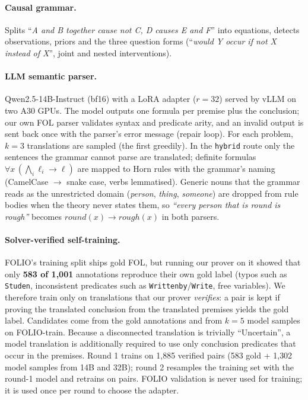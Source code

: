 \documentclass[10pt,a4paper]{article}
\begin{document}
\paragraph{Causal grammar.} Splits ``\emph{A and B together cause not C, D causes E and F}'' into equations, detects observations, priors and the three question forms (``\emph{would Y occur if not X instead of X}'', joint and nested interventions).

\paragraph{LLM semantic parser.} Qwen2.5-14B-Instruct (bf16) with a LoRA adapter ($r{=}32$) served by vLLM on two A30 GPUs. The model outputs one formula per premise plus the conclusion; our own FOL parser validates syntax and predicate arity, and an invalid output is sent back once with the parser's error message (repair loop). For each problem, $k{=}3$ translations are sampled (the first greedily). In the \texttt{hybrid} route only the sentences the grammar cannot parse are translated; definite formulas $\forall x\,(\bigwedge_i \ell_i \rightarrow \ell)$ are mapped to Horn rules with the grammar's naming (CamelCase $\rightarrow$ snake case, verbs lemmatised). Generic nouns that the grammar reads as the unrestricted domain (\emph{person}, \emph{thing}, \emph{someone}) are dropped from rule bodies when the theory never states them, so \emph{``every person that is round is rough''} becomes $\mathit{round}(x)\rightarrow\mathit{rough}(x)$ in both parsers.

\paragraph{Solver-verified self-training.} FOLIO's training split ships gold FOL, but running our prover on it showed that only \textbf{583 of 1{,}001} annotations reproduce their own gold label (typos such as \texttt{Studen}, inconsistent predicates such as \texttt{Writtenby}/\texttt{Write}, free variables). We therefore train only on translations that our prover \emph{verifies}: a pair is kept if proving the translated conclusion from the translated premises yields the gold label. Candidates come from the gold annotations and from $k{=}5$ model samples on FOLIO-train. Because a disconnected translation is trivially ``Uncertain'', a model translation is additionally required to use only conclusion predicates that occur in the premises. Round 1 trains on 1{,}885 verified pairs (583 gold + 1{,}302 model samples from 14B and 32B); round 2 resamples the training set with the round-1 model and retrains on \RtwoN{} pairs. FOLIO validation is never used for training; it is used once per round to choose the adapter.
\end{document}
